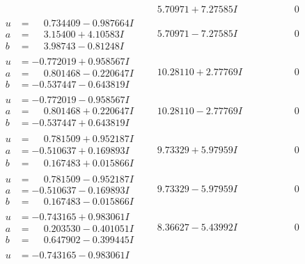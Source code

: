 \documentclass[1p]{elsarticle_modified}
\theoremstyle{definition}
\begin{document}
$$\begin{array}{c|c|c}
 & \phantom{-}5.70971 + 7.27585 I & \phantom{-0.000000 } 0 \\ \hline\begin{aligned}
u &= \phantom{-}0.734409 - 0.987664 I \\
a &= \phantom{-}3.15400 + 4.10583 I \\
b &= \phantom{-}3.98743 - 0.81248 I\end{aligned}
 & \phantom{-}5.70971 - 7.27585 I & \phantom{-0.000000 } 0 \\ \hline\begin{aligned}
u &= -0.772019 + 0.958567 I \\
a &= \phantom{-}0.801468 - 0.220647 I \\
b &= -0.537447 - 0.643819 I\end{aligned}
 & \phantom{-}10.28110 + 2.77769 I & \phantom{-0.000000 } 0 \\ \hline\begin{aligned}
u &= -0.772019 - 0.958567 I \\
a &= \phantom{-}0.801468 + 0.220647 I \\
b &= -0.537447 + 0.643819 I\end{aligned}
 & \phantom{-}10.28110 - 2.77769 I & \phantom{-0.000000 } 0 \\ \hline\begin{aligned}
u &= \phantom{-}0.781509 + 0.952187 I \\
a &= -0.510637 + 0.169893 I \\
b &= \phantom{-}0.167483 + 0.015866 I\end{aligned}
 & \phantom{-}9.73329 + 5.97959 I & \phantom{-0.000000 } 0 \\ \hline\begin{aligned}
u &= \phantom{-}0.781509 - 0.952187 I \\
a &= -0.510637 - 0.169893 I \\
b &= \phantom{-}0.167483 - 0.015866 I\end{aligned}
 & \phantom{-}9.73329 - 5.97959 I & \phantom{-0.000000 } 0 \\ \hline\begin{aligned}
u &= -0.743165 + 0.983061 I \\
a &= \phantom{-}0.203530 - 0.401051 I \\
b &= \phantom{-}0.647902 - 0.399445 I\end{aligned}
 & \phantom{-}8.36627 - 5.43992 I & \phantom{-0.000000 } 0 \\ \hline\begin{aligned}
u &= -0.743165 - 0.983061 I \\

\end{aligned}
\end{array}$$
\end{document}
